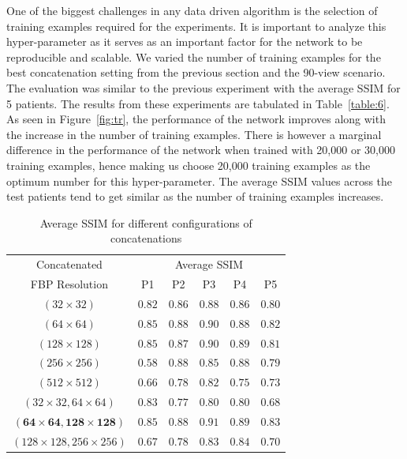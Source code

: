 One of the biggest challenges in any data driven algorithm is the selection of training examples required for the experiments. It is important to analyze this hyper-parameter as it serves as an important factor for the network to be reproducible and scalable. We varied the number of training examples for the best concatenation setting from the previous section and the 90-view scenario. The evaluation was similar to the previous experiment with the average \ac{SSIM} for 5 patients. The results from these experiments are tabulated in Table~\ref{table:6}. As seen in Figure~\ref{fig:tr}, the performance of the network improves along with the increase in the number of training examples. There is however a marginal difference in the performance of the network when trained with 20,000 or 30,000 training examples, hence making us choose 20,000 training examples as the optimum number for this hyper-parameter. The average \ac{SSIM} values across the test patients tend to get similar as the number of training examples increases.




\begin{table}[ht!]
	\centering
	\caption{Average \ac{SSIM} for different configurations of concatenations}
	\label{table:5}
	\begin{tabular}{||c|c|c|c|c|c||} 
		\hline
		Concatenated & \multicolumn{5}{c||}{Average \ac{SSIM}}  \\ \cline{2-6}%
		\ac{FBP} Resolution &   P1  &  P2     & P3 & P4 & P5 \\
		\hline\hline
		$(32\times32)$ & $0.82$ & $0.86$ & $0.88$ & $0.86$ & $0.80$ \\ 
		$(64\times64)$ & $0.85$ & $0.88$ & $0.90$ & $0.88$ & $0.82$ \\   
		$(128\times128)$ & $0.85$ & $0.87$ & $0.90$ & $0.89$ & $0.81$ \\   
		$(256\times256)$ & $0.58$ & $0.88$ & $0.85$ & $0.88$ & $0.79$ \\   
		$(512\times512)$ & $0.66$ & $0.78$ & $0.82$ & $0.75$ & $0.73$ \\   
		\hline
		$(32\times32,64\times64)$ & $0.83$ & $0.77$ & $0.80$ & $0.80$ & $0.68$ \\   
		$\mathbf{(64\times64,128\times128)}$ & $\mathbf{0.85}$ & $\mathbf{0.88}$ & $\mathbf{0.91}$ & $\mathbf{0.89}$ & $\mathbf{0.83}$ \\   
		$(128\times128,256\times256)$ & $0.67$ & $0.78$ & $0.83$ & $0.84$ & $0.70$ \\   
		\hline  
		
		\hline  
	\end{tabular}
	
\end{table}

